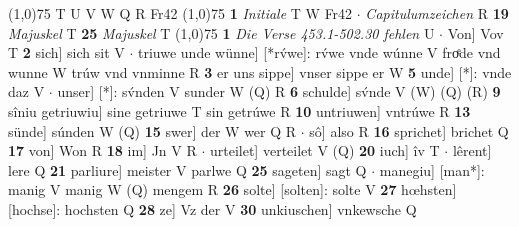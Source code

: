 \documentclass[8pt,a4paper,notitlepage]{article}
\begin{document}
\begin{table}[ht]
\begin{minipage}[t]{0.5\linewidth}
\begin{tabular}{rl}
\end{tabular}
\scriptsize
\line(1,0){75} \newline
T U V W Q R Fr42 \newline
\line(1,0){75} \newline
\textbf{1} \textit{Initiale} T W Fr42   $\cdot$ \textit{Capitulumzeichen} R  \textbf{19} \textit{Majuskel} T  \textbf{25} \textit{Majuskel} T  \newline
\line(1,0){75} \newline
\textbf{1} \textit{Die Verse 453.1-502.30 fehlen} U   $\cdot$ Von] Vov T \textbf{2} sich] sich sit V  $\cdot$ triuwe unde wünne] [*rv́we]: rv́we vnde wúnne V froͤde vnd wunne W trúw vnd vnminne R \textbf{3} er uns sippe] vnser sippe er W \textbf{5} unde] [*]: vnde daz V  $\cdot$ unser] [*]: sv́nden V sunder W (Q) R \textbf{6} schulde] sv́nde V (W) (Q) (R) \textbf{9} sîniu getriuwiu] sine getriuwe T sin getrúwe R \textbf{10} untriuwen] vntrúwe R \textbf{13} sünde] súnden W (Q) \textbf{15} swer] der W wer Q R  $\cdot$ sô] also R \textbf{16} sprichet] brichet Q \textbf{17} von] Won R \textbf{18} im] Jn V R  $\cdot$ urteilet] verteilet V (Q) \textbf{20} iuch] îv T  $\cdot$ lêrent] lere Q \textbf{21} parliure] meister V parlwe Q \textbf{25} sageten] sagt Q  $\cdot$ manegiu] [man*]: manig V manig W (Q) mengem R \textbf{26} solte] [solten]: solte V \textbf{27} hœhsten] [hochse]: hochsten Q \textbf{28} ze] Vz der V \textbf{30} unkiuschen] vnkewsche Q \newline
\end{minipage}
\end{table}
\end{document}
